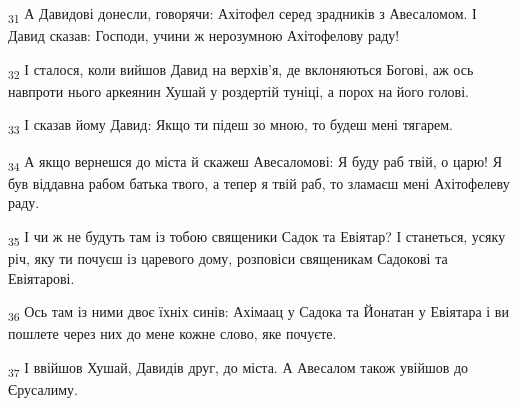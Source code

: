 \begin{tcolorbox}
\textsubscript{31} А Давидові донесли, говорячи: Ахітофел серед зрадників з Авесаломом. І Давид сказав: Господи, учини ж нерозумною Ахітофелову раду!
\end{tcolorbox}
\begin{tcolorbox}
\textsubscript{32} І сталося, коли вийшов Давид на верхів'я, де вклоняються Богові, аж ось навпроти нього аркеянин Хушай у роздертій туніці, а порох на його голові.
\end{tcolorbox}
\begin{tcolorbox}
\textsubscript{33} І сказав йому Давид: Якщо ти підеш зо мною, то будеш мені тягарем.
\end{tcolorbox}
\begin{tcolorbox}
\textsubscript{34} А якщо вернешся до міста й скажеш Авесаломові: Я буду раб твій, о царю! Я був віддавна рабом батька твого, а тепер я твій раб, то зламаєш мені Ахітофелеву раду.
\end{tcolorbox}
\begin{tcolorbox}
\textsubscript{35} І чи ж не будуть там із тобою священики Садок та Евіятар? І станеться, усяку річ, яку ти почуєш із царевого дому, розповіси священикам Садокові та Евіятарові.
\end{tcolorbox}
\begin{tcolorbox}
\textsubscript{36} Ось там із ними двоє їхніх синів: Ахімаац у Садока та Йонатан у Евіятара і ви пошлете через них до мене кожне слово, яке почуєте.
\end{tcolorbox}
\begin{tcolorbox}
\textsubscript{37} І ввійшов Хушай, Давидів друг, до міста. А Авесалом також увійшов до Єрусалиму.
\end{tcolorbox}
